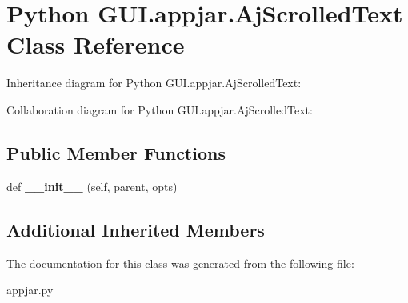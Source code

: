 \hypertarget{class_python_01_g_u_i_1_1appjar_1_1_aj_scrolled_text}{}\section{Python G\+U\+I.\+appjar.\+Aj\+Scrolled\+Text Class Reference}
\label{class_python_01_g_u_i_1_1appjar_1_1_aj_scrolled_text}


Inheritance diagram for Python G\+U\+I.\+appjar.\+Aj\+Scrolled\+Text\+:


Collaboration diagram for Python G\+U\+I.\+appjar.\+Aj\+Scrolled\+Text\+:
\subsection*{Public Member Functions}
\begin{DoxyCompactItemize}
\item 
\mbox{\label{class_python_01_g_u_i_1_1appjar_1_1_aj_scrolled_text_ac4bd85396b07660b6882a752e35bbd0d}} 
def {\bfseries \+\_\+\+\_\+init\+\_\+\+\_\+} (self, parent, opts)
\end{DoxyCompactItemize}
\subsection*{Additional Inherited Members}


The documentation for this class was generated from the following file\+:\begin{DoxyCompactItemize}
\item 
appjar.\+py\end{DoxyCompactItemize}
